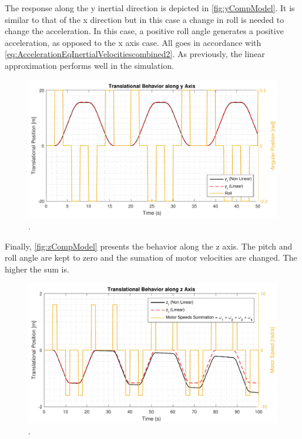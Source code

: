 The response along the y inertial direction is depicted in \autoref{fig:yCompModel}. It is similar to that of the x direction but in this case a change in roll is needed to change the acceleration. In this case, a positive roll angle generates a positive acceleration, as opposed to the x axis case. All goes in accordance with \autoref{eq:AccelerationEqInertialVelocitiescombined2}. As previously, the linear approximation performs well in the simulation.
\begin{figure}[H]
	\centering
	\includegraphics[scale=0.65]{figures/yCompModel}
	\caption{.}
	\label{fig:yCompModel}
\end{figure}

Finally, \autoref{fig:zCompModel} presents the behavior along the z axis. The pitch and roll angle are kept to zero and the sumation of motor velocities are changed. The higher the sum is.
\begin{figure}[H]
	\centering
	\includegraphics[scale=0.65]{figures/zCompModel}
	\caption{.}
	\label{fig:zCompModel}
\end{figure}






